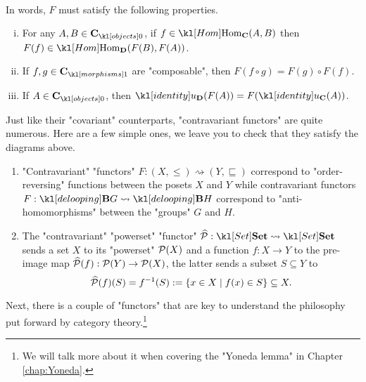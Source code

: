 \documentclass[main.tex]{subfiles}
\begin{document}
\begin{defn}
\begin{minipage}{0.49\textwidth}
\begin{equation}
		\end{equation}
	\end{minipage}\\
	In words, $F$ must satisfy the following properties.
	\begin{enumerate}[i.]
		\item For any $A, B \in \obj{\mathbf{C}}$, if $f \in \Hom_{\mathbf{C}}(A,B)$ then $F(f) \in \Hom_{\mathbf{D}}(F(B), F(A))$.
		\item If $f,g \in \mor{\mathbf{C}}$ are "composable", then $F(f\circ g) = F(g) \circ F(f)$.
		\item If $A \in \obj{\mathbf{C}}$, then $\idu_{\mathbf{D}}(F(A)) = F(\idu_{\mathbf{C}}(A))$.
	\end{enumerate}
\end{defn}
\begin{exmps}
	Just like their "covariant" counterparts, "contravariant functors" are quite numerous. Here are a few simple ones, we leave you to check that they satisfy the diagrams above.
	\begin{enumerate}
		\item "Contravariant" "functors" $F: (X, \leq) \rightsquigarrow (Y, \sqsubseteq)$ correspond to "order-reversing" functions between the posets $X$ and $Y$ while contravariant functors $F: \deloop{G}\rightsquigarrow \deloop{H}$ correspond to "anti-homomorphisms" between the "groups" $G$ and $H$.
		\item The "contravariant" "powerset" "functor" $\mPcontr: \catSet \rightsquigarrow \catSet$ sends a set $X$ to its "powerset" $\mathcal{P}(X)$ and a function $f: X\rightarrow Y$ to the pre-image map $\widehat{\mathcal{P}}(f):\mathcal{P}(Y)\rightarrow \mathcal{P}(X)$, the latter sends a subset $S\subseteq Y$ to \[\widehat{\mathcal{P}}(f)(S) = f^{-1}(S) := \{x \in X \mid f(x) \in S\} \subseteq X.\]
	\end{enumerate}
\end{exmps}
Next, there is a couple of "functors" that are key to understand the philosophy put forward by category theory.\footnote{We will talk more about it when covering the "Yoneda lemma" in Chapter \ref{chap:Yoneda}.}
\end{document}
